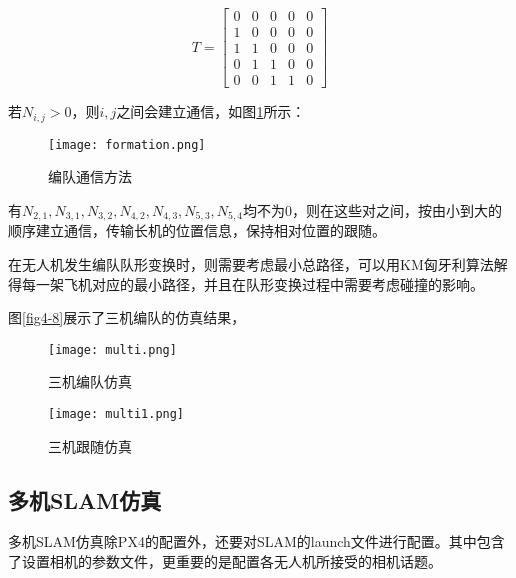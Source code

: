 $$
T=\begin{bmatrix}
0 & 0 & 0 & 0 & 0\\
1 & 0 & 0 & 0 & 0\\
1 & 1 & 0 & 0 & 0\\
0 & 1 & 1 & 0 & 0\\
0 & 0 & 1 & 1 & 0
\end{bmatrix}
$$

若$N_{i,j}>0$，则$i,j$之间会建立通信，如图\ref{fig4-7}所示：

\begin{figure}[!ht]
	\centering
	\texttt{[image: formation.png]}
	\caption{编队通信方法}
	\label{fig4-7}
\end{figure}

有$N_{2,1},N_{3,1},N_{3,2},N_{4,2},N_{4,3},N_{5,3},N_{5,4}$均不为0，则在这些对之间，按由小到大的顺序建立通信，传输长机的位置信息，保持相对位置的跟随。

在无人机发生编队队形变换时，则需要考虑最小总路径，可以用KM匈牙利算法解得每一架飞机对应的最小路径，并且在队形变换过程中需要考虑碰撞的影响\cite{XiaoKun}。

图\ref{fig4-8}展示了三机编队的仿真结果，



\begin{figure}[htbp]
	\centering
	\begin{minipage}[t]{0.45\columnwidth} %
		\centering
		\texttt{[image: multi.png]}
		\caption{三机编队仿真}
		\label{fig4-8}
	\end{minipage}
	\begin{minipage}[t]{0.45\columnwidth}
		\centering
		\texttt{[image: multi1.png]}
		\caption{三机跟随仿真}
		\label{fig4-8-1}
	\end{minipage}
\end{figure}


\subsection{多机SLAM仿真} \label{4.3.3}

多机SLAM仿真除PX4的配置外，还要对SLAM的launch文件进行配置。其中包含了设置相机的参数文件，更重要的是配置各无人机所接受的相机话题。

